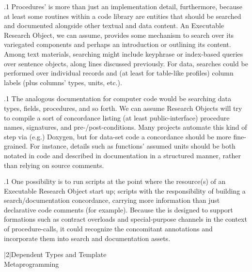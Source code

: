 \documentclass[11pt, twocolumn]{article}
\begin{document}
\p.1{%
Procedures'  is more than just an implementation detail,
furthermore, because at least some routines within a code library
are  entities that should be searched and documented
alongside other textual and data content. An Executable Research
Object, we can assume, provides some
mechanism to search over its variegated components
\mdash{} and perhaps
an introduction or  outlining its content.
Among text materials, searching might include keyphrase
or index-based queries over sentence objects, along lines
discussed previously. For data, searches could be performed
over individual records and (at least for table-like profiles)
column labels (plus columns' types, units, etc.).
}%

\p.1{%
The analogous documentation for computer code would be searching
data types, fields, procedures, and so forth. We can assume
Research Objects will try to compile a sort of concordance
listing (at least public-interface) procedure names, signatures,
and pre-/post-conditions. Many projects automate this kind of step
via (e.g.) Doxygen, but for data-set code a concordance
should be more fine-grained. For instance, details such as
functions' assumed units should be both notated in code and
described in documentation in a structured manner, rather than
relying on source comments.
}%

\p.1{%
One possibility is to run scripts at the point where the
 resource(s) of an Executable Research Object
start up; scripts with the responsibility of building
a search/documentation concordance, carrying more
information than just declarative code comments (for example).
Because the  is designed to support formations
such as contract overloads and special-purpose channels
in the context of procedure-calls, it could recognize
the concomitant annotations and incorporate them
into search and documentation assets.
}%


\s|2|{Dependent Types and Template\\Metaprogramming}
\end{document}
